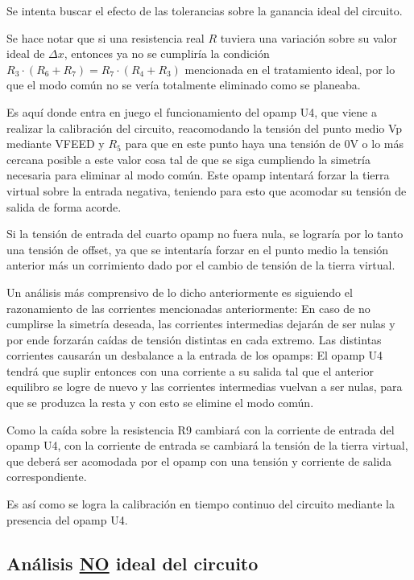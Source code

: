 \documentclass[../../tc_tp3_main.tex]{subfiles}
\begin{document}
Se intenta buscar el efecto de las tolerancias sobre la ganancia ideal del circuito.\par
Se hace notar que si una resistencia real $R$ tuviera una variación sobre su valor ideal de $\Delta x$, entonces ya no se cumpliría la condición $R_3\cdot (R_6 + R_7) = R_7\cdot (R_4 + R_3)$ mencionada en el tratamiento ideal, por lo que el modo común no se vería totalmente eliminado como se planeaba.\par 
Es aquí donde entra en juego el funcionamiento del opamp U4, que viene a realizar la calibración del circuito, reacomodando la tensión del punto medio Vp mediante VFEED y $R_5$ para que en este punto haya una tensión de 0V o lo más cercana posible a este valor cosa tal de que se siga cumpliendo la simetría necesaria para eliminar al modo común. 
Este opamp intentará forzar la tierra virtual sobre la entrada negativa, teniendo para esto que acomodar su tensión de salida de forma acorde. \par
Si la tensión de entrada del cuarto opamp no fuera nula, se lograría por lo tanto una tensión de offset, ya que se intentaría forzar en el punto medio la tensión anterior más un corrimiento dado por el cambio de tensión de la tierra virtual. \par
Un análisis más comprensivo de lo dicho anteriormente es siguiendo el razonamiento de las corrientes mencionadas anteriormente: En caso de no cumplirse la simetría deseada, las corrientes intermedias dejarán de ser nulas y por ende forzarán caídas de tensión distintas en cada extremo. Las distintas corrientes causarán un desbalance a la entrada de los opamps: El opamp U4 tendrá que suplir entonces con una corriente a su salida tal que el anterior equilibro se logre de nuevo y las corrientes intermedias vuelvan a ser nulas, para que se produzca la resta y con esto se elimine el modo común.\par
 Como la caída sobre la resistencia R9 cambiará con la corriente de entrada del opamp U4, con la corriente de entrada se cambiará la tensión de la tierra virtual, que deberá ser acomodada por el opamp con una tensión y corriente de salida correspondiente.\par
 Es así como se logra la calibración en tiempo continuo del circuito mediante la presencia del opamp U4.\par

  
\subsection{Análisis \underline{NO} ideal del circuito}
\end{document}
